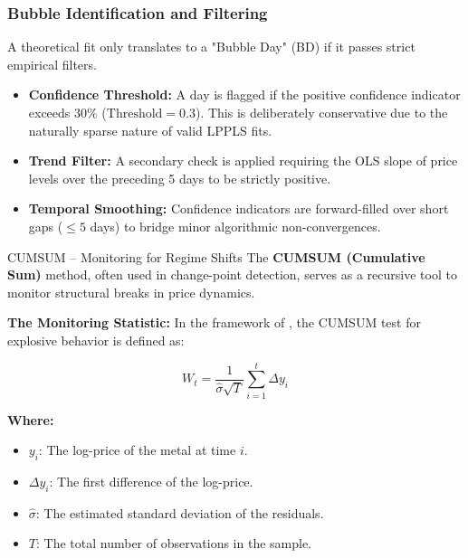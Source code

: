\documentclass{beamer}
\begin{document}
\begin{frame}
\frametitle{Bubble Identification and Filtering}
    A theoretical fit only translates to a "Bubble Day" (BD) if it passes strict empirical filters.

    \vspace{0.3cm}
    \begin{itemize}
        \item \textbf{Confidence Threshold:} A day is flagged if the positive confidence indicator exceeds $30\%$ ($\text{Threshold} = 0.3$). This is deliberately conservative due to the naturally sparse nature of valid LPPLS fits.
        \item \textbf{Trend Filter:} A secondary check is applied requiring the OLS slope of price levels over the preceding 5 days to be strictly positive.
        \item \textbf{Temporal Smoothing:} Confidence indicators are forward-filled over short gaps ($\le 5$ days) to bridge minor algorithmic non-convergences.
    \end{itemize}

\end{frame}

\begin{frame}{CUMSUM -- Monitoring for Regime Shifts}
    The \textbf{CUMSUM (Cumulative Sum)} method, often used in change-point detection, serves as a recursive tool to monitor structural breaks in price dynamics.
    
    \vspace{0.3cm}
    \textbf{The Monitoring Statistic:}
    In the framework of \citep{homm2012testing}, the CUMSUM test for explosive behavior is defined as:
    
    \begin{equation}
        W_t = \frac{1}{\hat{\sigma} \sqrt{T}} \sum_{i=1}^{t} \Delta y_i
    \end{equation}
    
    \textbf{Where:}
    \begin{itemize}
        \item $y_i$: The log-price of the metal at time $i$.
        \item $\Delta y_i$: The first difference of the log-price.
        \item $\hat{\sigma}$: The estimated standard deviation of the residuals.
        \item $T$: The total number of observations in the sample.
    \end{itemize}
\end{frame}
\end{document}
